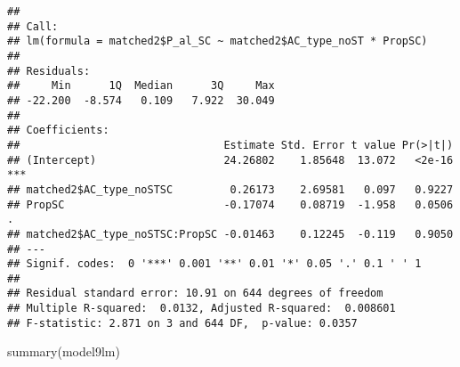 \documentclass[
]{article}
\newenvironment{Shaded}{\begin{snugshade}}{\end{snugshade}}
\newcommand{\FunctionTok}[1]{\textcolor[rgb]{0.00,0.00,0.00}{#1}}
\newcommand{\NormalTok}[1]{#1}
\begin{document}
\begin{verbatim}
## 
## Call:
## lm(formula = matched2$P_al_SC ~ matched2$AC_type_noST * PropSC)
## 
## Residuals:
##     Min      1Q  Median      3Q     Max 
## -22.200  -8.574   0.109   7.922  30.049 
## 
## Coefficients:
##                                Estimate Std. Error t value Pr(>|t|)    
## (Intercept)                    24.26802    1.85648  13.072   <2e-16 ***
## matched2$AC_type_noSTSC         0.26173    2.69581   0.097   0.9227    
## PropSC                         -0.17074    0.08719  -1.958   0.0506 .  
## matched2$AC_type_noSTSC:PropSC -0.01463    0.12245  -0.119   0.9050    
## ---
## Signif. codes:  0 '***' 0.001 '**' 0.01 '*' 0.05 '.' 0.1 ' ' 1
## 
## Residual standard error: 10.91 on 644 degrees of freedom
## Multiple R-squared:  0.0132, Adjusted R-squared:  0.008601 
## F-statistic: 2.871 on 3 and 644 DF,  p-value: 0.0357
\end{verbatim}

\begin{Shaded}
\begin{Highlighting}[]
\FunctionTok{summary}\NormalTok{(model9lm)}
\end{Highlighting}
\end{Shaded}
\end{document}
